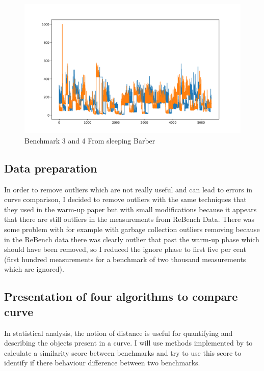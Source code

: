 \documentclass[12pt,a4paper]{article}
\begin{document}
\begin{figure}[h!]
    \centering
    \includegraphics[width=1\textwidth]{plot_1.png}
    \caption{Benchmark 3 and 4 From sleeping Barber}
    \label{fig:bench_2_3}
\end{figure}

\subsection{Data preparation}

In order to remove outliers which are not really useful and can lead to errors in curve comparison, I decided to remove outliers with the same techniques that they used in the warm-up paper but with small modifications because it appears that there are still outliers in the measurements from ReBench Data. There was some problem with for example with garbage collection outliers removing because in the ReBench data there was clearly outlier that past the warm-up phase which should have been removed, so I reduced the ignore phase to first five per cent (first hundred measurements for a benchmark of two thousand measurements which are ignored).


\subsection{Presentation of four algorithms to compare curve}

In statistical analysis, the notion of distance is useful for quantifying and describing the objects present in
a curve. I will use methods implemented by \citep{jekel2019similarity} to calculate a similarity score between benchmarks and try to use this score to identify if there behaviour difference between two benchmarks.
\end{document}
